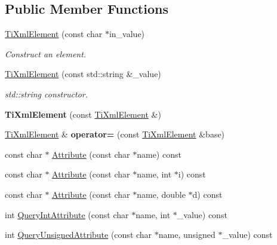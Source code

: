 \subsection*{Public Member Functions}
\begin{DoxyCompactItemize}
\item 
\hypertarget{class_ti_xml_element_a01bc3ab372d35da08efcbbe65ad90c60}{\hyperlink{class_ti_xml_element_a01bc3ab372d35da08efcbbe65ad90c60}{Ti\+Xml\+Element} (const char $\ast$in\+\_\+value)}\label{class_ti_xml_element_a01bc3ab372d35da08efcbbe65ad90c60}

\begin{DoxyCompactList}\small\item\em Construct an element. \end{DoxyCompactList}\item 
\hypertarget{class_ti_xml_element_a40fc2e3c1a955e2f78e1a32350d180e7}{\hyperlink{class_ti_xml_element_a40fc2e3c1a955e2f78e1a32350d180e7}{Ti\+Xml\+Element} (const std\+::string \&\+\_\+value)}\label{class_ti_xml_element_a40fc2e3c1a955e2f78e1a32350d180e7}

\begin{DoxyCompactList}\small\item\em std\+::string constructor. \end{DoxyCompactList}\item 
\hypertarget{class_ti_xml_element_a1ca4465f3c2eac6a60e641cd7f1d9f7e}{{\bfseries Ti\+Xml\+Element} (const \hyperlink{class_ti_xml_element}{Ti\+Xml\+Element} \&)}\label{class_ti_xml_element_a1ca4465f3c2eac6a60e641cd7f1d9f7e}

\item 
\hypertarget{class_ti_xml_element_ad58d300f4cfc0016ffa6861ebb718a0b}{\hyperlink{class_ti_xml_element}{Ti\+Xml\+Element} \& {\bfseries operator=} (const \hyperlink{class_ti_xml_element}{Ti\+Xml\+Element} \&base)}\label{class_ti_xml_element_ad58d300f4cfc0016ffa6861ebb718a0b}

\item 
const char $\ast$ \hyperlink{class_ti_xml_element_ac1e4691e9375ba4e665dce7e46a50a9c}{Attribute} (const char $\ast$name) const 
\item 
const char $\ast$ \hyperlink{class_ti_xml_element_aa9192e80567b5042dbded80b78c44339}{Attribute} (const char $\ast$name, int $\ast$i) const 
\item 
const char $\ast$ \hyperlink{class_ti_xml_element_aec4f727f8aa49b51248d80125d173136}{Attribute} (const char $\ast$name, double $\ast$d) const 
\item 
int \hyperlink{class_ti_xml_element_aea0bfe471380f281c5945770ddbf52b9}{Query\+Int\+Attribute} (const char $\ast$name, int $\ast$\+\_\+value) const 
\item 
\hypertarget{class_ti_xml_element_ae48df644f890ab86fa19839ac401f00d}{int \hyperlink{class_ti_xml_element_ae48df644f890ab86fa19839ac401f00d}{Query\+Unsigned\+Attribute} (const char $\ast$name, unsigned $\ast$\+\_\+value) const }\label{class_ti_xml_element_ae48df644f890ab86fa19839ac401f00d}


\end{DoxyCompactItemize}
